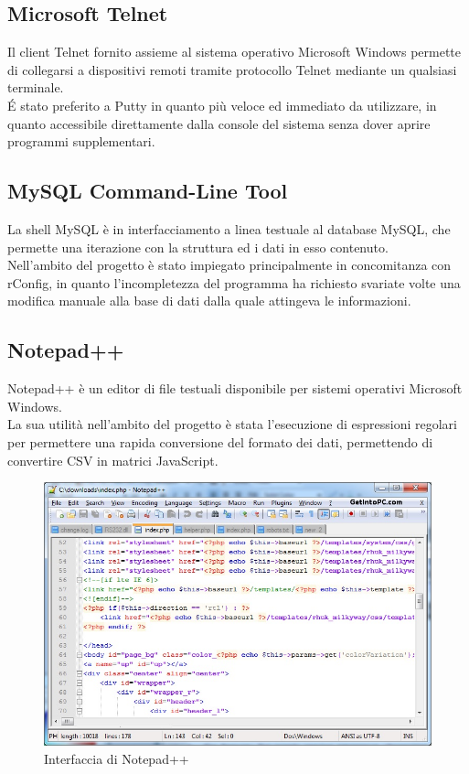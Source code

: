\documentclass[Tesi.tex]{subfiles}
\begin{document}
\subsection{Microsoft Telnet}
Il client Telnet fornito assieme al sistema operativo Microsoft Windows permette di collegarsi a dispositivi remoti tramite protocollo Telnet mediante un qualsiasi terminale. \\
\'E stato preferito a Putty in quanto più veloce ed immediato da utilizzare, in quanto accessibile direttamente dalla console del sistema senza dover aprire programmi supplementari.

\subsection{MySQL Command-Line Tool}
La shell MySQL è in interfacciamento a linea testuale al database MySQL, che permette una iterazione con la struttura ed i dati in esso contenuto. \\
Nell'ambito del progetto è stato impiegato principalmente in concomitanza con rConfig, in quanto l'incompletezza del programma ha richiesto svariate volte una modifica manuale alla base di dati dalla quale attingeva le informazioni.

\subsection{Notepad++}
Notepad++ è un editor di file testuali disponibile per sistemi operativi Microsoft Windows.\\
La sua utilità nell'ambito del progetto è stata l'esecuzione di espressioni regolari per permettere una rapida conversione del formato dei dati, permettendo di convertire CSV in matrici JavaScript.
\begin{figure}[H]
	\centering
	\includegraphics[width=0.65\linewidth]{"images/notepad++"}
	\caption{Interfaccia di Notepad++}
	\label{fig:Interfaccia di Notepad++}
\end{figure}
\end{document}
